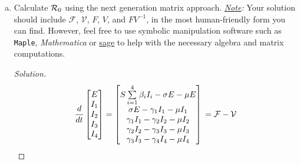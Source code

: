 \documentclass[12pt]{article}\usepackage[]{graphicx}\usepackage[]{color}
\begin{document}
\begin{enumerate}[(a)]
{\color{blue}
\begin{proof}[Solution]
{\color{magenta}\dots beautifully clear and concise text to be inserted here\dots}
\end{proof}
}

  \item Calculate ${\cal R}_0$ using the next generation matrix approach.  \emph{\underline{Note}:} Your solution should include $\mathcal F$, $\mathcal V$, $F$, $V$, and $FV^{-1}$, in the most human-friendly form you can find.  However, feel free to use symbolic manipulation software such as \texttt{Maple}, {\slshape Mathematica\/} or \href{http://www.sagemath.org/}{sage} to help with the necessary algebra and matrix computations.

{\color{blue}
\begin{proof}[Solution]
{\color{magenta}

\[
\frac{d}{dt}
\begin{bmatrix}
  E \\
  I_1 \\
  I_2 \\
  I_3 \\
  I_4
\end{bmatrix}
=
\begin{bmatrix}
  S\sum\limits_{i=1}^{4}\beta_i I_i - \sigma E - \mu E \\
  \sigma E - \gamma_1 I_1 -\mu I_1 \\
  \gamma_{1} I_{1} -\gamma_{2} I_{2} -\mu I_{2} \\
  \gamma_{2} I_{2} -\gamma_{3} I_{3} -\mu I_{3} \\
  \gamma_{3} I_{3} -\gamma_{4} I_{4} -\mu I_{4} 
\end{bmatrix}
\\
= \mathcal{F} - \mathcal{V}
\]

}
\end{proof}}
\end{enumerate}
\end{document}
